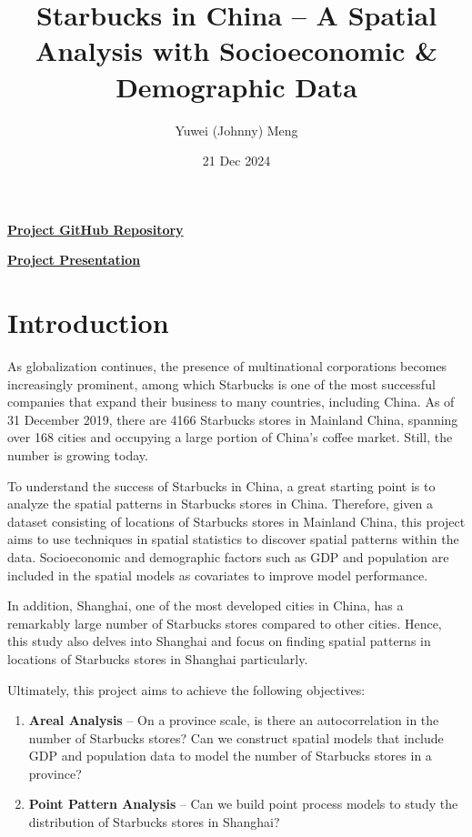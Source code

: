 \documentclass{article}
\title{Starbucks in China -- A Spatial Analysis with Socioeconomic \& Demographic Data}
\author{Yuwei (Johnny) Meng}
\date{21 Dec 2024}
\begin{document}
\pagestyle{fancy}

\maketitle

\thispagestyle{empty}

\href{https://github.com/BullDF/starbucks-in-china}{\textbf{Project GitHub Repository}}

\href{https://play.library.utoronto.ca/watch/c4d71902f00f5e6fe91bea00974fce6c}{\textbf{Project Presentation}}

\section{Introduction}

As globalization continues, the presence of multinational corporations becomes increasingly prominent, among which Starbucks is one of the most successful companies that expand their business to many countries, including China. As of 31 December 2019, there are 4166 Starbucks stores in Mainland China, spanning over 168 cities and occupying a large portion of China's coffee market. Still, the number is growing today.

To understand the success of Starbucks in China, a great starting point is to analyze the spatial patterns in Starbucks stores in China. Therefore, given a dataset consisting of locations of Starbucks stores in Mainland China, this project aims to use techniques in spatial statistics to discover spatial patterns within the data. Socioeconomic and demographic factors such as GDP and population are included in the spatial models as covariates to improve model performance.

In addition, Shanghai, one of the most developed cities in China, has a remarkably large number of Starbucks stores compared to other cities. Hence, this study also delves into Shanghai and focus on finding spatial patterns in locations of Starbucks stores in Shanghai particularly.

Ultimately, this project aims to achieve the following objectives:

\begin{enumerate}
    \item \textbf{Areal Analysis} -- On a province scale, is there an autocorrelation in the number of Starbucks stores? Can we construct spatial models that include GDP and population data to model the number of Starbucks stores in a province?
    \item \textbf{Point Pattern Analysis} -- Can we build point process models to study the distribution of Starbucks stores in Shanghai?
\end{enumerate}
\end{document}
